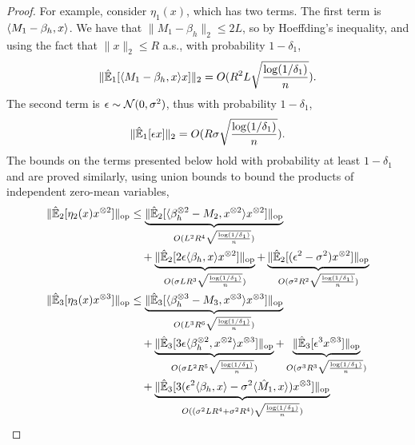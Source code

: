 \documentclass[tablecaption=bottom]{jmlr}
\newcommand\op{{\textrm{op}}}
\newcommand{\Lop}{\textrm{op}}
\begin{document}
\begin{proof}
For example, consider $\eta_1(x)$, which has two terms. 
The first term is $\langle M_1 - \beta_h, x \rangle$.  We have that $\|M_1 - \beta_h\|_2 \le 2L$, so by Hoeffding's inequality, and using the fact that $\|x\|_2 \le R$ a.s., with probability $1-\delta_1$, $$\|\hat{\operatorname{\mathbb{E}}}_1[\langle M_1 - \beta_h, x \rangle x]\|_2 = O(R^2 L \sqrt{\frac{\log(1/\delta_1)}{n}}).$$ 
The second term is $\epsilon \sim \mathcal{N}(0, \sigma^2)$, thus with probability $1-\delta_1$, $$\|\hat{\operatorname{\mathbb{E}}}_1[\epsilon x]\|_2 = O(R \sigma \sqrt{\frac{\log(1/\delta_1)}{n}}).$$ 
The bounds on the terms presented below hold with probability at least $1-\delta_1$ and are proved similarly, using union bounds to bound the products of independent zero-mean variables,
{
\begin{align*}
    \| \hat\E_2[ \eta_2(x) x\tp{2} ] \|_\Lop &\le 
            \underbrace{ \|\hat\E_2[\innerp{\beta_h\tp{2} - M_2}{x\tp{2}} x\tp{2}]\|_\op }_{ O( L^2 R^4      \sqrt{\frac{\log(1/\delta_1)}{n}} ) } \\
   &\quad + \underbrace{ \|\hat\E_2[2 \epsilon \innerp{\beta_h}{x} x\tp{2}]\|_\op        }_{ O( \sigma L R^3 \sqrt{\frac{\log(1/\delta_1)}{n}} ) } 
          + \underbrace{ \|\hat\E_2[(\epsilon^2 - \sigma^2) x\tp{2}]\|_\op               }_{ O( \sigma^2 R^2 \sqrt{\frac{\log(1/\delta_1)}{n}} ) } \\
  \| \hat\E_3[ \eta_3(x) x\tp{3} ] \|_\Lop &\le 
            \underbrace{ \|\hat\E_3[\innerp{\beta_h\tp{3} - M_3}{x\tp{3}}                      x\tp{3}]\|_\op }_{O( L^3 R^6        \sqrt{\frac{\log(1/\delta_1)}{n}} ) } \\
   &\quad + \underbrace{ \|\hat\E_3[3 \epsilon \innerp{\beta_h\tp{2}}{x\tp{2}}                 x\tp{3}]\|_\op }_{O( \sigma L^2 R^5 \sqrt{\frac{\log(1/\delta_1)}{n}} ) } 
          + \underbrace{ \|\hat\E_3[\epsilon^3                                                 x\tp{3}]\|_\op }_{O( \sigma^3 R^3   \sqrt{\frac{\log (1/\delta_1)}{n}} ) } \\
   &\quad + \underbrace{ \|\hat\E_3[3(\epsilon^2 \innerp{\beta_h}{x} -\sigma^2 \innerp{\hat M_1}{x}) x\tp{3}]\|_\op }_{O( (\sigma^2 L R^4 + \sigma^2 R^4) \sqrt{\frac{\log(1/\delta_1)}{n}} ) } \\

\end{align*}}
\end{proof}
\end{document}
